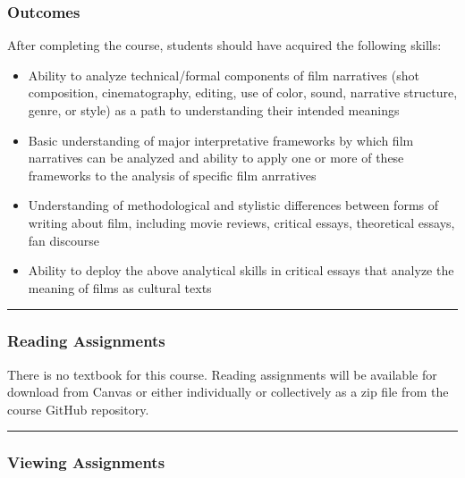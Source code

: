 \documentclass[]{tufte-handout}
\providecommand{\tightlist}{%
  \setlength{\itemsep}{0pt}\setlength{\parskip}{0pt}}
\begin{document}
\hypertarget{outcomes}{%
\subsubsection{Outcomes}\label{outcomes}}

After completing the course, students should have acquired the following
skills:

\begin{itemize}
\tightlist
\item
  Ability to analyze technical/formal components of film narratives
  (shot composition, cinematography, editing, use of color, sound,
  narrative structure, genre, or style) as a path to understanding their
  intended meanings
\item
  Basic understanding of major interpretative frameworks by which film
  narratives can be analyzed and ability to apply one or more of these
  frameworks to the analysis of specific film anrratives
\item
  Understanding of methodological and stylistic differences between
  forms of writing about film, including movie reviews, critical essays,
  theoretical essays, fan discourse
\item
  Ability to deploy the above analytical skills in critical essays that
  analyze the meaning of films as cultural texts
\end{itemize}

\begin{center}\rule{0.5\linewidth}{0.5pt}\end{center}

\hypertarget{reading-assignments}{%
\subsubsection{Reading Assignments}\label{reading-assignments}}

There is no textbook for this course. Reading assignments will be
available for download from Canvas or either individually or
collectively as a zip file from the course GitHub repository.

\begin{center}\rule{0.5\linewidth}{0.5pt}\end{center}

\hypertarget{viewing-assignments}{%
\subsubsection{Viewing Assignments}\label{viewing-assignments}}
\end{document}
